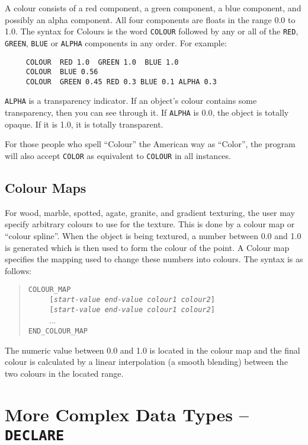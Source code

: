 A colour consists of a red component, a green component, a blue
component, and possibly an alpha component.  All four components are
floats in the range 0.0 to 1.0.  The syntax for Colours is the word
{\tt COLOUR} followed by any or all of the {\tt RED}, {\tt GREEN},
{\tt BLUE} or {\tt ALPHA} components in any order. For example:
\begin{verbatim}
     COLOUR  RED 1.0  GREEN 1.0  BLUE 1.0
     COLOUR  BLUE 0.56
     COLOUR  GREEN 0.45 RED 0.3 BLUE 0.1 ALPHA 0.3
\end{verbatim}
{\tt ALPHA} is a transparency indicator.  If an object's colour
contains some transparency, then you can see through it.  If
{\tt ALPHA} is 0.0, the object is totally opaque.  If it is 1.0, it is
totally transparent.

For those people who spell ``Colour'' the American way as ``Color'',
the program will also accept {\tt COLOR}
as equivalent to {\tt COLOUR} in all instances.

\subsection{Colour Maps}

For wood, marble, spotted, agate, granite, and gradient texturing, the user
may specify arbitrary colours to use for the texture.  This is done by a
colour map or ``colour spline''.  When the object is being textured, a number
between 0.0 and 1.0 is generated which is then used to form the colour of the
point.  A Colour map specifies the mapping used to change these numbers into
colours. The syntax is as follows:
\begin{verse}
{\tt COLOUR_MAP} \\
{\tt \ \ \ \ \ [{\em start-value end-value colour1 colour2\/}]} \\
{\tt \ \ \ \ \ [{\em start-value end-value colour1 colour2\/}]} \\
\ \ \ \ \ ... \\
{\tt END_COLOUR_MAP}
\end{verse}
The numeric value between 0.0 and 1.0 is located in the colour map and the
final colour is calculated by a linear interpolation (a smooth blending)
between the two colours in the located range.

\section{More Complex Data Types -- {\tt DECLARE}}


